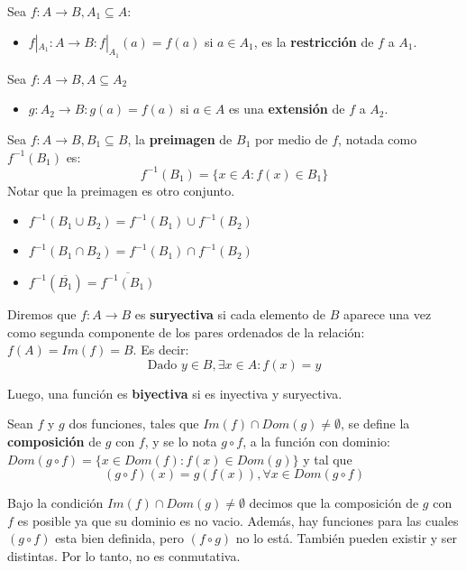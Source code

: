 \documentclass[11pt,a4paper]{article}
\begin{document}
\noindent Sea $f:A\rightarrow B, A_1 \subseteq A$:
\begin{itemize}
\item $f|_{A_1} : A \rightarrow B : f|_{A_1}(a) = f(a)$ si $a \in A_1$, es la \textbf{restricci\'on} de $f$ a $A_1$.
\end{itemize}
Sea $f:A\rightarrow B, A \subseteq A_2$
\begin{itemize}
\item $g : A_2 \rightarrow B : g(a) = f(a)$ si $a \in A$ es una \textbf{extensi\'on} de $f$ a $A_2$.
\end{itemize}
\noindent \dotfill

Sea $f: A \rightarrow B, B_1 \subseteq B$, la \textbf{preimagen} de $B_1$ por medio de $f$, notada como $f^{-1}(B_1)$ es:
$$f^{-1}(B_1) = \{ x \in A : f(x) \in B_1 \}$$
Notar que la preimagen es otro conjunto.\\

\begin{itemize}
\item $f^{-1}(B_1 \cup B_2) = f^{-1}(B_1) \cup f^{-1}(B_2)$
\item $f^{-1}(B_1 \cap B_2) = f^{-1}(B_1) \cap f^{-1}(B_2)$
\item $f^{-1}(\overline{B_1}) = \overline{f^{-1}(B_1)}$
\end{itemize}
\noindent \dotfill

Diremos que $f : A \rightarrow B$ es \textbf{suryectiva} si cada elemento de $B$ aparece una vez como segunda componente de los pares ordenados de la relaci\'on: $f(A) = Im(f) = B$. Es decir:$$ \text{Dado } y \in B, \exists x \in A : f(x) = y $$
\noindent \dotfill

Luego, una funci\'on es \textbf{biyectiva} si es inyectiva y suryectiva.

\noindent \dotfill
\newpage

Sean $f$ y $g$ dos funciones, tales que $Im(f) \cap Dom(g) \not = \emptyset$, se define la \textbf{composici\'on} de $g$ con $f$, y se lo nota $g \circ f$, a la funci\'on con dominio: $Dom (g \circ f) = \{ x \in Dom(f) : f(x) \in Dom(g) \}$ y tal que $$(g \circ f) (x) = g(f(x)), \forall x \in Dom(g \circ f)$$

Bajo la condici\'on $Im(f) \cap Dom(g) \not = \emptyset$ decimos que la composici\'on de $g$ con $f$ es posible ya que su dominio es no vacio. Adem\'as, hay funciones para las cuales $(g\circ f)$ esta bien definida, pero $(f\circ g)$ no lo est\'a. Tambi\'en pueden existir y ser distintas. Por lo tanto, no es conmutativa.\\
\end{document}
